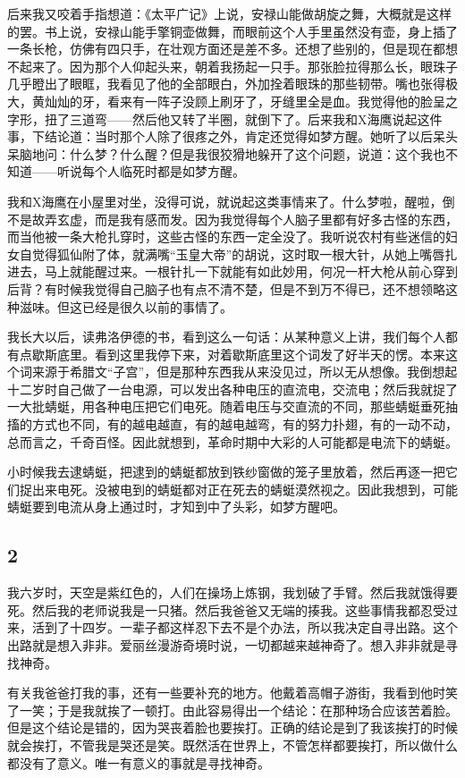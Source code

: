 后来我又咬着手指想道：《太平广记》上说，安禄山能做胡旋之舞，大概就是这样的罢。书上说，安禄山能手擎铜壶做舞，而眼前这个人手里虽然没有壶，身上插了一条长枪，仿佛有四只手，在壮观方面还是差不多。还想了些别的，但是现在都想不起来了。因为那个人仰起头来，朝着我扬起一只手。那张脸拉得那么长，眼珠子几乎瞪出了眼眶，我看见了他的全部眼白，外加拴着眼珠的那些韧带。嘴也张得极大，黄灿灿的牙，看来有一阵子没顾上刷牙了，牙缝里全是血。我觉得他的脸呈之字形，扭了三道弯——然后他又转了半圈，就倒下了。后来我和X海鹰说起这件事，下结论道：当时那个人除了很疼之外，肯定还觉得如梦方醒。她听了以后呆头呆脑地问：什么梦？什么醒？但是我很狡猾地躲开了这个问题，说道：这个我也不知道——听说每个人临死时都是如梦方醒。 

我和X海鹰在小屋里对坐，没得可说，就说起这类事情来了。什么梦啦，醒啦，倒不是故弄玄虚，而是我有感而发。因为我觉得每个人脑子里都有好多古怪的东西，而当他被一条大枪扎穿时，这些古怪的东西一定全没了。我听说农村有些迷信的妇女自觉得狐仙附了体，就满嘴“玉皇大帝”的胡说，这时取一根大针，从她上嘴唇扎进去，马上就能醒过来。一根针扎一下就能有如此妙用，何况一杆大枪从前心穿到后背？有时候我觉得自己脑子也有点不清不楚，但是不到万不得已，还不想领略这种滋味。但这已经是很久以前的事情了。 

我长大以后，读弗洛伊德的书，看到这么一句话：从某种意义上讲，我们每个人都有点歇斯底里。看到这里我停下来，对着歇斯底里这个词发了好半天的愣。本来这个词来源于希腊文“子宫”，但是那种东西我从来没见过，所以无从想像。我倒想起十二岁时自己做了一台电源，可以发出各种电压的直流电，交流电；然后我就捉了一大批蜻蜓，用各种电压把它们电死。随着电压与交直流的不同，那些蜻蜓垂死抽搐的方式也不同，有的越电越直，有的越电越弯，有的努力扑翅，有的一动不动，总而言之，千奇百怪。因此就想到，革命时期中大彩的人可能都是电流下的蜻蜓。 

小时候我去逮蜻蜓，把逮到的蜻蜓都放到铁纱窗做的笼子里放着，然后再逐一把它们捉出来电死。没被电到的蜻蜓都对正在死去的蜻蜓漠然视之。因此我想到，可能蜻蜓要到电流从身上通过时，才知到中了头彩，如梦方醒吧。 

\subsection{2} 

我六岁时，天空是紫红色的，人们在操场上炼钢，我划破了手臂。然后我就饿得要死。然后我的老师说我是一只猪。然后我爸爸又无端的揍我。这些事情我都忍受过来，活到了十四岁。一辈子都这样忍下去不是个办法，所以我决定自寻出路。这个出路就是想入非非。爱丽丝漫游奇境时说，一切都越来越神奇了。想入非非就是寻找神奇。 

有关我爸爸打我的事，还有一些要补充的地方。他戴着高帽子游街，我看到他时笑了一笑；于是我就挨了一顿打。由此容易得出一个结论：在那种场合应该苦着脸。但是这个结论是错的，因为哭丧着脸也要挨打。正确的结论是到了我该挨打的时候就会挨打，不管我是哭还是笑。既然活在世界上，不管怎样都要挨打，所以做什么都没有了意义。唯一有意义的事就是寻找神奇。 

